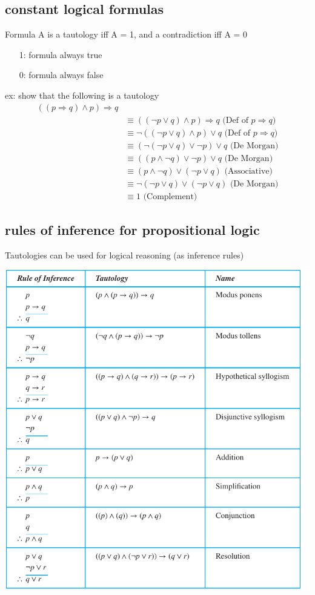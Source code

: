 \documentclass{article}
\begin{document}
\subsection{constant logical formulas}
Formula A is a tautology iff A = 1, and a contradiction iff A = 0
\begin{itemize}
    \item [1:] formula always true
    \item [0:] formula always false
\end{itemize}
ex: show that the following is a tautology
\begin{align*}
    ((p \Rightarrow  q) \land p) \Rightarrow q
    \\ & \equiv ((\lnot p \lor  q) \land p) \Rightarrow q \text{ (Def of $p \Rightarrow  q$)}
    \\ & \equiv \lnot ((\lnot p \lor  q) \land p) \lor q \text{ (Def of $p \Rightarrow  q$)}
    \\ & \equiv (\lnot(\lnot p \lor  q) \lor \lnot p) \lor q \text{ (De Morgan)}
    \\ & \equiv ((p \land \lnot q) \lor \lnot p) \lor q \text{ (De Morgan)}
    \\ & \equiv (p \land \lnot q) \lor (\lnot p \lor q) \text{ (Associative)}
    \\ & \equiv \lnot(\lnot p \lor q) \lor (\lnot p \lor q) \text{ (De Morgan)}
    \\ & \equiv 1 \text{ (Complement)}
\end{align*}

\subsection{rules of inference for propositional logic}
Tautologies can be used for logical reasoning (as inference rules)

\includegraphics[width=\textwidth,height=\textheight,keepaspectratio]{l4_2}
\pagebreak
\end{document}
